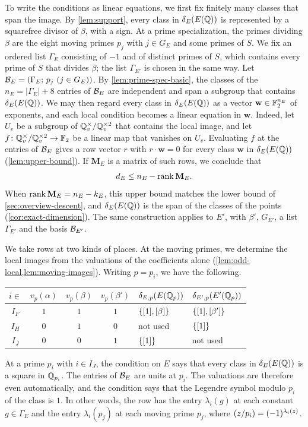 To write the conditions as linear equations, we first fix finitely many classes that span the image. By \cref{lem:support}, every class in $\delta_E(E(\mathbb Q))$ is represented by a squarefree divisor of $\beta$, with a sign. At a prime specialization, the primes dividing $\beta$ are the eight moving primes $p_j$ with $j\in G_E$ and some primes of $S$. We fix an ordered list $\Gamma_E$ consisting of $-1$ and of distinct primes of $S$, which contains every prime of $S$ that divides $\beta$; the list $\Gamma_{E'}$ is chosen in the same way. Let $\mathcal B_E=(\Gamma_E;\,p_j\ (j\in G_E))$. By \cref{lem:prime-spec-basic}, the classes of the $n_E=|\Gamma_E|+8$ entries of $\mathcal B_E$ are independent and span a subgroup that contains $\delta_E(E(\mathbb Q))$. We may then regard every class in $\delta_E(E(\mathbb Q))$ as a vector $\mathbf w\in\mathbb F_2^{n_E}$ of exponents, and each local condition becomes a linear equation in $\mathbf w$. Indeed, let $U_v$ be a subgroup of $\mathbb Q_v^{\times}/\mathbb Q_v^{\times2}$ that contains the local image, and let $f\colon\mathbb Q_v^{\times}/\mathbb Q_v^{\times2}\to\mathbb F_2$ be a linear map that vanishes on $U_v$. Evaluating $f$ at the entries of $\mathcal B_E$ gives a row vector $r$ with $r\cdot\mathbf w=0$ for every class $\mathbf w$ in $\delta_E(E(\mathbb Q))$ (\cref{lem:upper-bound}). If $\mathbf M_E$ is a matrix of such rows, we conclude that
\begin{equation*}
d_E\le n_E-\operatorname{rank}\mathbf M_E.
\end{equation*}
When $\operatorname{rank}\mathbf M_E=n_E-k_E$, this upper bound matches the lower bound of \cref{sec:overview-descent}, and $\delta_E(E(\mathbb Q))$ is the span of the classes of the points (\cref{cor:exact-dimension}). The same construction applies to $E'$, with $\beta'$, $G_{E'}$, a list $\Gamma_{E'}$ and the basis $\mathcal B_{E'}$.

We take rows at two kinds of places. At the moving primes, we determine the local images from the valuations of the coefficients alone (\cref{lem:odd-local,lem:moving-images}). Writing $p=p_i$, we have the following.
\begin{center}
\begin{tabular}{ccccll}
\toprule
$i\in$ & $v_p(\alpha)$ & $v_p(\beta)$ & $v_p(\beta')$ & $\delta_{E,p}(E(\mathbb Q_p))$ & $\delta_{E',p}(E'(\mathbb Q_p))$\\
\midrule
$I_F$ & $1$ & $1$ & $1$ & $\{[1],[\beta]\}$ & $\{[1],[\beta']\}$\\
$I_H$ & $0$ & $1$ & $0$ & not used & $\{[1]\}$\\
$I_J$ & $0$ & $0$ & $1$ & $\{[1]\}$ & not used\\
\bottomrule
\end{tabular}
\end{center}
At a prime $p_i$ with $i\in I_J$, the condition on $E$ says that every class in $\delta_E(E(\mathbb Q))$ is a square in $\mathbb Q_{p_i}$. The entries of $\mathcal B_E$ are units at $p_i$. The valuations are therefore even automatically, and the condition says that the Legendre symbol modulo $p_i$ of the class is $1$. In other words, the row has the entry $\lambda_i(g)$ at each constant $g\in\Gamma_E$ and the entry $\lambda_i(p_j)$ at each moving prime $p_j$, where $\leg z{p_i}=(-1)^{\lambda_i(z)}$.

